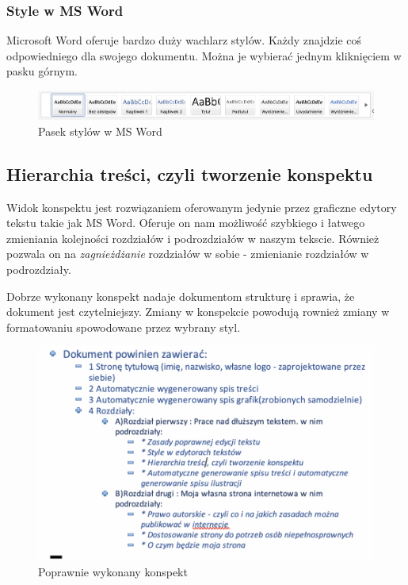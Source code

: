\documentclass[11pt,polish]{article}
\begin{document}
\subsubsection{Style w MS Word}
  Microsoft Word oferuje bardzo duży wachlarz stylów. Każdy znajdzie coś odpowiedniego dla swojego dokumentu. Można je wybierać jednym kliknięciem w pasku górnym.

\begin{center}
    \begin{figure}[h]
        \centering
        \includegraphics[width=\textwidth]{style}
        \caption{Pasek stylów w MS Word}
    \end{figure}
\end{center}


\subsection{Hierarchia treści, czyli tworzenie konspektu}
Widok konspektu jest rozwiązaniem oferowanym jedynie przez graficzne edytory tekstu takie jak MS Word. Oferuje on nam możliwość szybkiego i łatwego zmieniania kolejności rozdziałów i podrozdziałów w naszym tekscie. Również pozwala on na \emph{zagnieżdżanie} rozdziałów w sobie - zmienianie rozdziałów w podrozdziały. 

Dobrze wykonany konspekt nadaje dokumentom strukturę i sprawia, że dokument jest czytelniejszy. Zmiany w konspekcie powodują rownież zmiany w formatowaniu spowodowane przez wybrany styl.

\begin{center}
  \begin{figure}[h]
      \centering
      \includegraphics[scale=0.7]{konspekt}
      \caption{Poprawnie wykonany konspekt}
  \end{figure}
\end{center}
\end{document}
